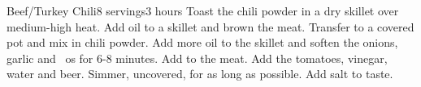 \begin{recipe}{Beef/Turkey Chili}{8 servings}{3 hours}
Toast the chili powder in a dry skillet over medium-high heat.
Add oil to a skillet and brown the meat.  Transfer to a covered pot and mix in chili powder.
Add more oil to the skillet and soften the onions, garlic and ~os for 6-8 minutes.  Add to the meat.
Add the tomatoes, vinegar, water and beer.  Simmer, uncovered, for as long as possible.  Add salt to taste.
\end{recipe}
